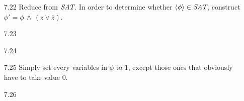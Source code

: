 \begin{itemize}
	\item[7.22]
	Reduce from $\textit{SAT}$. In order to determine whether $\langle {\phi} \rangle \in \textit{SAT}$, construct $\phi' = \phi \,\wedge\,(z \vee \overline{z})$.
	
	\item[7.23]
	\Omit
	
	\item[7.24]
	\Empty
	
	\item[7.25]
	Simply set every variables in $\phi$ to 1, except those ones that obviously have to take value $0$.
	
	\item[7.26]
	\Empty
	
\end{itemize}
